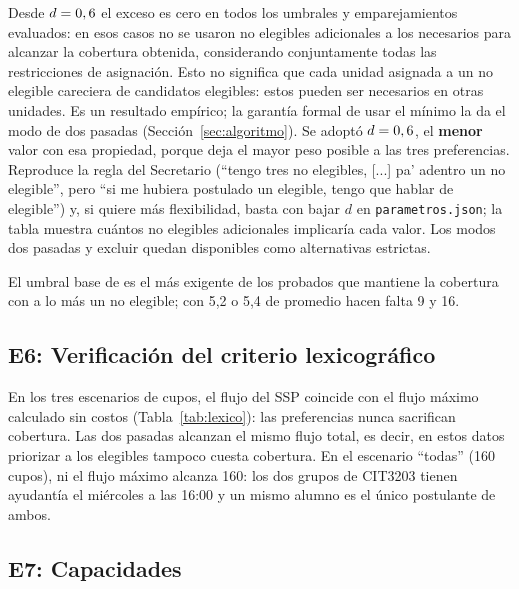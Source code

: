 \documentclass{article}
\begin{document}
Desde $d = 0,6$ el exceso es cero en todos los umbrales y emparejamientos evaluados: en esos casos no se usaron no elegibles adicionales a los necesarios para alcanzar la cobertura obtenida, considerando conjuntamente todas las restricciones de asignación. Esto no significa que cada unidad asignada a un no elegible careciera de candidatos elegibles: estos pueden ser necesarios en otras unidades. Es un resultado empírico; la garantía formal de usar el mínimo la da el modo de dos pasadas (Sección~\ref{sec:algoritmo}). Se adoptó $d = 0,6$, el \textbf{menor} valor con esa propiedad, porque deja el mayor peso posible a las tres preferencias. Reproduce la regla del Secretario (``tengo tres no elegibles, [...] pa' adentro un no elegible'', pero ``si me hubiera postulado un elegible, tengo que hablar de elegible'') y, si quiere más flexibilidad, basta con bajar $d$ en \texttt{parametros.json}; la tabla muestra cuántos no elegibles adicionales implicaría cada valor. Los modos dos pasadas y excluir quedan disponibles como alternativas estrictas.

El umbral base de \elegPromMin{} es el más exigente de los probados que mantiene la cobertura con a lo más un no elegible; con 5,2 o 5,4 de promedio hacen falta 9 y 16.

\subsection{E6: Verificación del criterio lexicográfico}

\begin{table}[H]
\centering
\small

\caption{Flujo del SSP (todas las aristas) comparado con el flujo máximo sin costos, calculado con \texttt{networkx}, y flujo total de las dos pasadas.}
\label{tab:lexico}
\end{table}

En los tres escenarios de cupos, el flujo del SSP coincide con el flujo máximo calculado sin costos (Tabla~\ref{tab:lexico}): las preferencias nunca sacrifican cobertura. Las dos pasadas alcanzan el mismo flujo total, es decir, en estos datos priorizar a los elegibles tampoco cuesta cobertura. En el escenario ``todas'' (160 cupos), ni el flujo máximo alcanza 160: los dos grupos de CIT3203 tienen ayudantía el miércoles a las 16:00 y un mismo alumno es el único postulante de ambos.

\subsection{E7: Capacidades}
\label{sec:res-capacidades}
\end{document}
